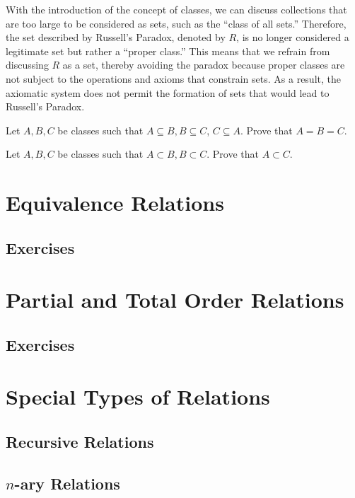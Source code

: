 \begin{solution}
    With the introduction of the concept of classes, we can discuss collections 
    that are too large to be considered as sets, such as the ``class of all sets.'' 
    Therefore, the set described by Russell's Paradox, denoted by \( R \), 
    is no longer considered a legitimate set but rather a ``proper class.'' 
    This means that we refrain from discussing \( R \) as a set, thereby avoiding 
    the paradox because proper classes are not subject to the operations and 
    axioms that constrain sets. As a result, the axiomatic system does not 
    permit the formation of sets that would lead to Russell's Paradox.

\end{solution}
\begin{exercise}
    Let $A,B,C$ be classes such that $A\subseteq B,B\subseteq C$, $C\subseteq A.$ Prove that $A=B=C.$
\end{exercise}

\begin{exercise}
    Let $A,B,C$ be classes such that $A\subset B,B\subset C.$ Prove that $A\subset C.$
\end{exercise}


\section{Equivalence Relations}



\subsection{Exercises}
\section{Partial and Total Order Relations}



\subsection{Exercises}
\section{Special Types of Relations}
\subsection{Recursive Relations}
\subsection{\(n\)-ary Relations}

